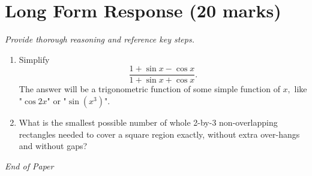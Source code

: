 \documentclass[12pt]{article}
\begin{document}
\section*{Long Form Response (20 marks)}
\textit{Provide thorough reasoning and reference key steps.}
\begin{enumerate}[label=\arabic*.]
\item Simplify \[\frac{1 + \sin x - \cos x}{1 + \sin x + \cos x}.\]The answer will be a
trigonometric function of some simple function of $x,$ like "$\cos 2x$" or "$\sin (x^3)$".
\item What is the smallest possible number of whole 2-by-3 non-overlapping rectangles needed to
cover a square region exactly, without extra over-hangs and without gaps?
\end{enumerate}

\vfill
\noindent\textit{End of Paper}
\end{document}
